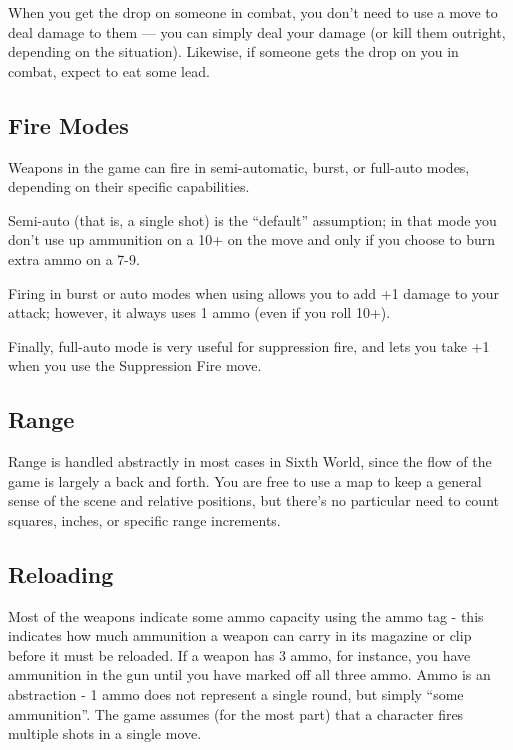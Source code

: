 When you get the drop on someone in combat, you don’t need to use a move to deal damage to them — you can simply deal your damage (or kill them outright, depending on the situation). Likewise, if someone gets the drop on you in combat, expect to eat some lead.


\subsection*{Fire Modes}
Weapons in the game can fire in semi-automatic, burst, or full-auto modes, depending on their specific capabilities.

Semi-auto (that is, a single shot) is the ``default'' assumption; in that mode you don't use up ammunition on a 10+ on the  move and only if you choose to burn extra ammo on a 7-9.

Firing in burst or auto modes when using  allows you to add +1 damage to your attack; however, it always uses 1 ammo (even if you roll 10+).

Finally, full-auto mode is very useful for suppression fire, and lets you take +1 when you use the Suppression Fire move.



\subsection*{Range}
Range is handled abstractly in most cases in Sixth World, since the flow of the game is largely a back and forth. You are free to use a map to keep a general sense of the scene and relative positions, but there’s no particular need to count squares, inches, or specific range increments.


\subsection*{Reloading}
Most of the weapons indicate some ammo capacity using the ammo tag - this indicates how much ammunition a weapon can carry in its magazine or clip before it must be reloaded. If a weapon has 3 ammo, for instance, you have ammunition in the gun until you have marked off all three ammo. Ammo is an abstraction - 1 ammo does not represent a single round, but simply ``some ammunition''. The game assumes (for the most part) that a character fires multiple shots in a single move.

